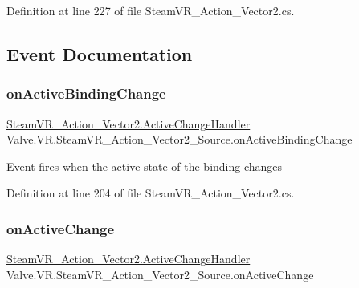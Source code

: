 Definition at line 227 of file Steam\+V\+R\+\_\+\+Action\+\_\+\+Vector2.\+cs.



\subsection{Event Documentation}
\mbox{\label{class_valve_1_1_v_r_1_1_steam_v_r___action___vector2___source_a677e3fd6c4b5d1bcc300a9da605358e3}} 
\subsubsection{\texorpdfstring{onActiveBindingChange}{onActiveBindingChange}}
{\footnotesize\ttfamily \mbox{\hyperlink{class_valve_1_1_v_r_1_1_steam_v_r___action___vector2_ad01c83284de71c0d9cd8f7e673ce5ab5}{Steam\+V\+R\+\_\+\+Action\+\_\+\+Vector2.\+Active\+Change\+Handler}} Valve.\+V\+R.\+Steam\+V\+R\+\_\+\+Action\+\_\+\+Vector2\+\_\+\+Source.\+on\+Active\+Binding\+Change}



Event fires when the active state of the binding changes 



Definition at line 204 of file Steam\+V\+R\+\_\+\+Action\+\_\+\+Vector2.\+cs.

\mbox{\label{class_valve_1_1_v_r_1_1_steam_v_r___action___vector2___source_a142aa3f31f7934e26694858fdbfb927e}} 
\subsubsection{\texorpdfstring{onActiveChange}{onActiveChange}}
{\footnotesize\ttfamily \mbox{\hyperlink{class_valve_1_1_v_r_1_1_steam_v_r___action___vector2_ad01c83284de71c0d9cd8f7e673ce5ab5}{Steam\+V\+R\+\_\+\+Action\+\_\+\+Vector2.\+Active\+Change\+Handler}} Valve.\+V\+R.\+Steam\+V\+R\+\_\+\+Action\+\_\+\+Vector2\+\_\+\+Source.\+on\+Active\+Change}



